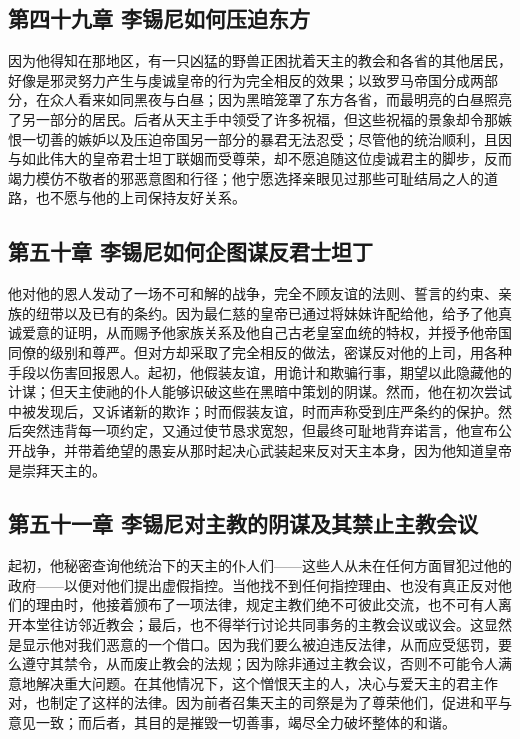 \subsection{第四十九章 李锡尼如何压迫东方}

因为他得知在那地区，有一只凶猛的野兽正困扰着天主的教会和各省的其他居民，好像是邪灵努力产生与虔诚皇帝的行为完全相反的效果；以致罗马帝国分成两部分，在众人看来如同黑夜与白昼；因为黑暗笼罩了东方各省，而最明亮的白昼照亮了另一部分的居民。后者从天主手中领受了许多祝福，但这些祝福的景象却令那嫉恨一切善的嫉妒以及压迫帝国另一部分的暴君无法忍受；尽管他的统治顺利，且因与如此伟大的皇帝君士坦丁联姻而受尊荣，却不愿追随这位虔诚君主的脚步，反而竭力模仿不敬者的邪恶意图和行径；他宁愿选择亲眼见过那些可耻结局之人的道路，也不愿与他的上司保持友好关系。\par


\subsection{第五十章 李锡尼如何企图谋反君士坦丁}

他对他的恩人发动了一场不可和解的战争，完全不顾友谊的法则、誓言的约束、亲族的纽带以及已有的条约。因为最仁慈的皇帝已通过将妹妹许配给他，给予了他真诚爱意的证明，从而赐予他家族关系及他自己古老皇室血统的特权，并授予他帝国同僚的级别和尊严。但对方却采取了完全相反的做法，密谋反对他的上司，用各种手段以伤害回报恩人。起初，他假装友谊，用诡计和欺骗行事，期望以此隐藏他的计谋；但天主使祂的仆人能够识破这些在黑暗中策划的阴谋。然而，他在初次尝试中被发现后，又诉诸新的欺诈；时而假装友谊，时而声称受到庄严条约的保护。然后突然违背每一项约定，又通过使节恳求宽恕，但最终可耻地背弃诺言，他宣布公开战争，并带着绝望的愚妄从那时起决心武装起来反对天主本身，因为他知道皇帝是崇拜天主的。\par


\subsection{第五十一章 李锡尼对主教的阴谋及其禁止主教会议}

起初，他秘密查询他统治下的天主的仆人们——这些人从未在任何方面冒犯过他的政府——以便对他们提出虚假指控。当他找不到任何指控理由、也没有真正反对他们的理由时，他接着颁布了一项法律，规定主教们绝不可彼此交流，也不可有人离开本堂往访邻近教会；最后，也不得举行讨论共同事务的主教会议或议会。这显然是显示他对我们恶意的一个借口。因为我们要么被迫违反法律，从而应受惩罚，要么遵守其禁令，从而废止教会的法规；因为除非通过主教会议，否则不可能令人满意地解决重大问题。在其他情况下，这个憎恨天主的人，决心与爱天主的君主作对，也制定了这样的法律。因为前者召集天主的司祭是为了尊荣他们，促进和平与意见一致；而后者，其目的是摧毁一切善事，竭尽全力破坏整体的和谐。\par

